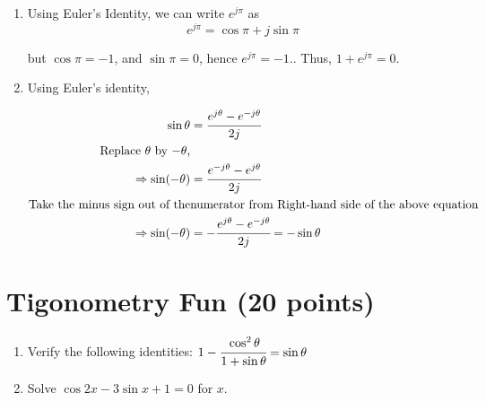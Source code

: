 \documentclass[12pt, xcolor=dvipsnames,svgnames,x11names]{article}
\begin{document}
\begin{answerbox}

   \begin{enumerate}
      \item Using Euler's Identity, we can write $e^{j\pi}$ as 
      $$
      e^{j\pi} = \cos\pi + j \sin \pi
      $$

      but $\cos\pi = -1$, and $\sin \pi = 0$, hence $e^{j\pi} = -1.$. Thus, $1 + e^{j\pi}  = 0$.

      \item Using Euler's identity, 

      \begin{equation}
         \begin{split}
               \sin \theta & = \cfrac{e^{j\theta} - e^{-j\theta}}{2j}\\
               \text{Replace $\theta$ by $-\theta$,}\\
               \Rightarrow \sin(-\theta) & = \cfrac{e^{-j\theta} - e^{j\theta}}{2j}\\
               \text{Take the minus sign out of the} &\text{numerator from Right-hand side of the above equation}\\
               \Rightarrow \sin(-\theta) & = - \cfrac{e^{j\theta} - e^{-j\theta}}{2j} = -\sin \theta
         \end{split}
      \end{equation}
   \end{enumerate}
  
  \end{answerbox}

   \section{Tigonometry Fun (20 points)}

   \begin{enumerate}
      \item Verify the following identities: $1 - \cfrac{\cos^2 \theta}{1+\sin\theta} = \sin \theta$

      
      \item Solve $\cos 2x - 3\sin x + 1 = 0$ for $x$.
   \end{enumerate}
   
\end{document}
